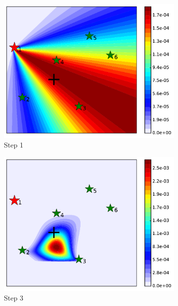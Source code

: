 \documentclass[journal]{IEEEtranTIE}
\theoremstyle{remark}
\begin{document}
\begin{figure}[p]%
	\centering
	\begin{subfigure}{0.23\textwidth}%
		\includegraphics[width=\textwidth]{figures/brg_sta_sen_sta_tar_rbt1_step1}
		\caption{Step 1}\label{fig:sta_sen_sta_tar_sing1}
	\end{subfigure}
	\begin{subfigure}{0.23\textwidth}%
		\includegraphics[width=\textwidth]{figures/brg_sta_sen_sta_tar_rbt1_step3}
		\caption{Step 3}\label{fig:sta_sen_sta_tar_sing2}
	\end{subfigure}
	\begin{subfigure}{0.23\textwidth}%

\end{subfigure}
\end{figure}
\end{document}
